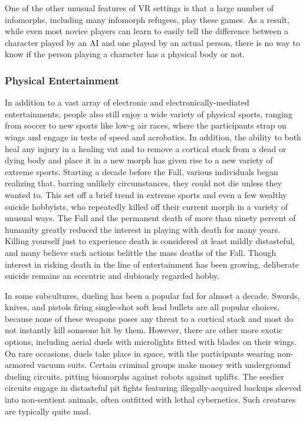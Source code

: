 One of the other unusual features of VR settings is 
that a large number of infomorphs, including many 
infomorph refugees, play these games. As a result, 
while even most novice players can learn to easily tell 
the difference between a character played by an AI 
and one played by an actual person, there is no way 
to know if the person playing a character has a physical body or not.

\subsubsection{Physical Entertainment}

In addition to a vast array of electronic and 
electronically-mediated entertainments, people also 
still enjoy a wide variety of physical sports, ranging 
from soccer to new sports like low-g air races, where 
the participants strap on wings and engage in tests 
of speed and acrobatics. In addition, the ability to 
both heal any injury in a healing vat and to remove a 
cortical stack from a dead or dying body and place it 
in a new morph has given rise to a new variety of extreme sports. Starting a decade before the Fall, various individuals began realizing that, barring unlikely 
circumstances, they could not die unless they wanted 
to. This set off a brief trend in extreme sports and 
even a few wealthy suicide hobbyists, who repeatedly 
killed off their current morph in a variety of unusual 
ways. The Fall and the permanent death of more 
than ninety percent of humanity greatly reduced the 
interest in playing with death for many years. Killing yourself just to experience death is considered 
at least mildly distasteful, and many believe such 
actions belittle the mass deaths of the Fall. Though 
interest in risking death in the line of entertainment 
has been growing, deliberate suicide remains an eccentric and dubiously regarded hobby.

In some subcultures, dueling has been a popular fad 
for almost a decade. Swords, knives, and pistols firing 
single-shot soft lead bullets are all popular choices, 
because none of these weapons poses any threat to a 
cortical stack and most do not instantly kill someone 
hit by them. However, there are other more exotic 
options, including aerial duels with microlights fitted 
with blades on their wings. On rare occasions, duels 
take place in space, with the participants wearing 
non-armored vacuum suits. Certain criminal groups 
make money with underground dueling circuits, pitting biomorphs against robots against uplifts. The 
seedier circuits engage in distasteful pit fights featuring illegally-acquired backups sleeved into non-sentient animals, often outfitted with lethal cybernetics. 
Such creatures are typically quite mad.

